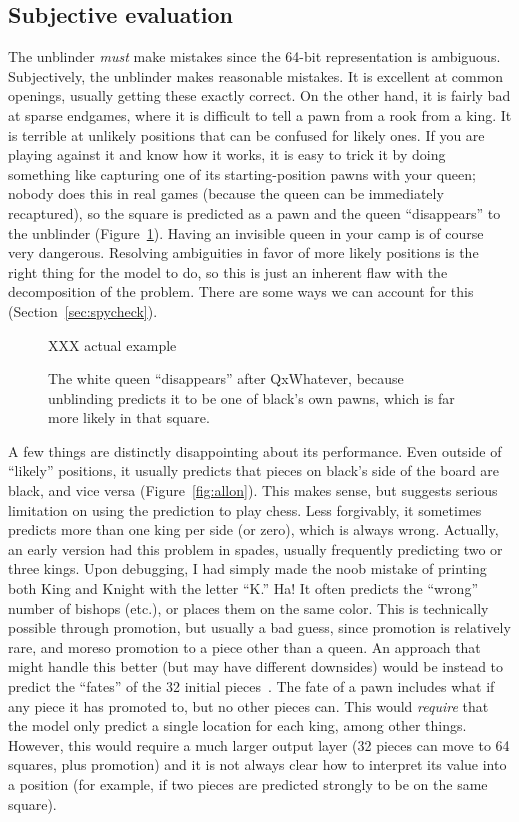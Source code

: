 \documentclass[twocolumn]{amsart}
\begin{document}
\subsection{Subjective evaluation}

The unblinder {\em must} make mistakes since the 64-bit representation
is ambiguous. Subjectively, the unblinder makes reasonable mistakes.
It is excellent at common openings, usually getting these exactly
correct. On the other hand, it is fairly bad at sparse endgames, where
it is difficult to tell a pawn from a rook from a king. It is terrible
at unlikely positions that can be confused for likely ones. If you are
playing against it and know how it works, it is easy to trick it by
doing something like capturing one of its starting-position pawns with
your queen; nobody does this in real games (because the queen can be
immediately recaptured), so the square is predicted as a pawn and the
queen ``disappears'' to the unblinder (Figure~\ref{fig:trick}). Having
an invisible queen in your camp is of course very dangerous. Resolving
ambiguities in favor of more likely positions is the right thing for
the model to do, so this is just an inherent flaw with the
decomposition of the problem. There are some ways we can account for
this (Section~\ref{sec:spycheck}).

\begin{figure}[ht]
XXX actual example
\caption{The white queen ``disappears'' after QxWhatever, because
  unblinding predicts it to be one of black's own pawns, which is far
  more likely in that square.} \label{fig:trick}
\end{figure}

A few things are distinctly disappointing about its performance. Even
outside of ``likely'' positions, it usually predicts that pieces on
black's side of the board are black, and vice versa
(Figure~\ref{fig:allon}). This makes sense, but suggests serious
limitation on using the prediction to play chess. Less forgivably, it
sometimes predicts more than one king per side (or zero), which is
always wrong. Actually, an early version had this problem in spades,
usually frequently predicting two or three kings. Upon debugging, I
had simply made the noob mistake of printing both King and Knight with
the letter ``K.'' Ha! It often predicts the ``wrong'' number of
bishops (etc.), or places them on the same color. This is technically
possible through promotion, but usually a bad guess, since promotion
is relatively rare, and moreso promotion to a piece other than a
queen. An approach that might handle this better (but may have
different downsides) would be instead to predict the ``fates'' of the
32 initial pieces~\cite{survival}. The fate of a pawn includes what if
any piece it has promoted to, but no other pieces can. This would {\em
  require} that the model only predict a single location for each
king, among other things. However, this would require a much larger
output layer (32 pieces can move to 64 squares, plus promotion) and it
is not always clear how to interpret its value into a position (for
example, if two pieces are predicted strongly to be on the same
square).
\end{document}
